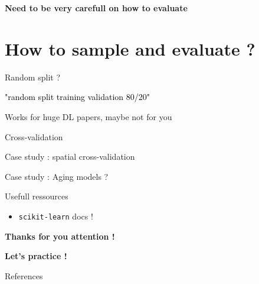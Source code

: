 \documentclass{irdbeamer}
\let\oldcite=\cite
\renewcommand{\cite}[1]{\textcolor[rgb]{.5,.5,.7}{\oldcite{#1}}}
\begin{document}
\begin{frame}{}
    \centering
    \textbf{Need to be very carefull on how to evaluate}
\end{frame}

\section{How to sample and evaluate ?}

\begin{frame}{Random split ?}
    \begin{center}
    \textcolor{black}{"random split training validation 80/20"}
    \end{center}

    \pause
    
        \centering
        \vspace{-0.5cm}

            \cite{oquab2023dinov2}
    
    \pause
    Works for huge DL papers, maybe not for you
\end{frame}

\begin{frame}{Cross-validation}
    
\end{frame}

\begin{frame}{Case study : spatial cross-validation}
    
\end{frame}

\begin{frame}{Case study : Aging models ?}
    
\end{frame}



\begin{frame}{Usefull ressources}

\begin{itemize}
    \item \texttt{scikit-learn} docs !
\end{itemize}
\end{frame}

\begin{frame}[plain]
    \Huge{\textbf{Thanks for you attention !}}
    
    \vfill
    
    \LARGE{\textbf{Let's practice !}}
\end{frame}

\appendix
\begin{frame}[allowframebreaks]{References}
    {\footnotesize \printbibliography[heading=none]}
\end{frame}
\end{document}
